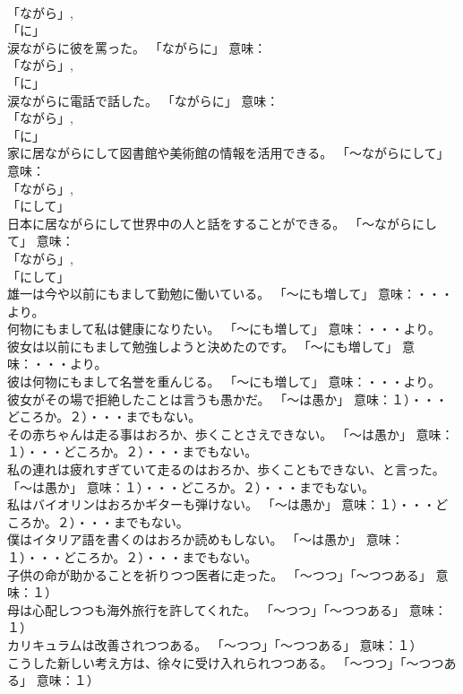 \documentclass[8pt]{extreport}
\begin{document}
\begin{CJK}{UTF8}{min}
\\	「ながら」, 
\\	「に」
\\	涙ながらに彼を罵った。	「ながらに」 意味： 
\\	「ながら」, 
\\	「に」
\\	涙ながらに電話で話した。	「ながらに」 意味： 
\\	「ながら」, 
\\	「に」
\\	家に居ながらにして図書館や美術館の情報を活用できる。	「～ながらにして」 意味：
\\	「ながら」, 
\\	「にして」
\\	日本に居ながらにして世界中の人と話をすることができる。	「～ながらにして」 意味：
\\	「ながら」, 
\\	「にして」
\\	雄一は今や以前にもまして勤勉に働いている。	「～にも増して」 意味：・・・より。	
\\	何物にもまして私は健康になりたい。	「～にも増して」 意味：・・・より。	
\\	彼女は以前にもまして勉強しようと決めたのです。	「～にも増して」 意味：・・・より。	
\\	彼は何物にもまして名誉を重んじる。	「～にも増して」 意味：・・・より。	
\\	彼女がその場で拒絶したことは言うも愚かだ。	「～は愚か」 意味：１）・・・どころか。２）・・・までもない。	
\\	その赤ちゃんは走る事はおろか、歩くことさえできない。	「～は愚か」 意味：１）・・・どころか。２）・・・までもない。	
\\	私の連れは疲れすぎていて走るのはおろか、歩くこともできない、と言った。	「～は愚か」 意味：１）・・・どころか。２）・・・までもない。	
\\	私はバイオリンはおろかギターも弾けない。	「～は愚か」 意味：１）・・・どころか。２）・・・までもない。	
\\	僕はイタリア語を書くのはおろか読めもしない。	「～は愚か」 意味：１）・・・どころか。２）・・・までもない。	
\\	子供の命が助かることを祈りつつ医者に走った。	「～つつ」「～つつある」 意味：１）
\\	母は心配しつつも海外旅行を許してくれた。	「～つつ」「～つつある」 意味：１）
\\	カリキュラムは改善されつつある。	「～つつ」「～つつある」 意味：１）
\\	こうした新しい考え方は、徐々に受け入れられつつある。	「～つつ」「～つつある」 意味：１）

\end{CJK}
\end{document}
